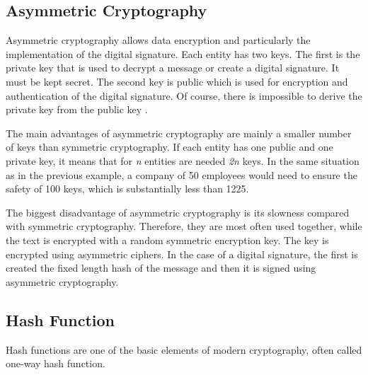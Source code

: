 \documentclass[
  digital, %
  notable,   %
  lof,     %
  lot,     %
]{fithesis3}
\begin{document}
\subsection{Asymmetric Cryptography}
Asymmetric cryptography allows data encryption and particularly the implementation of the 
digital signature. Each entity has two keys. The first is the private key that is used to 
decrypt a message or create a digital signature. It must be kept secret. The second key is 
public which is used for encryption and authentication of the digital signature. Of course, 
there is impossible to derive the private key from the public key \cite{dostalek2016velky}.

The main advantages of asymmetric cryptography are mainly a smaller number of keys than 
symmetric cryptography. If each entity has one public and one private key, it means that for 
\textit{n} entities are needed \textit{2n} keys. In the same situation as in the previous 
example, a company of 50 employees would need to ensure the safety of 100 keys, which is 
substantially less than 1225.

The biggest disadvantage of asymmetric cryptography is its slowness compared with symmetric 
cryptography. Therefore, they are most often used together, while the text is encrypted with a 
random symmetric encryption key. The key is encrypted using asymmetric ciphers. In the case of 
a digital signature, the first is created the fixed length hash of the message and then it is 
signed using asymmetric cryptography.

\subsection{Hash Function}
Hash functions are one of the basic elements of modern cryptography, often called one-way 
hash function.
\end{document}
